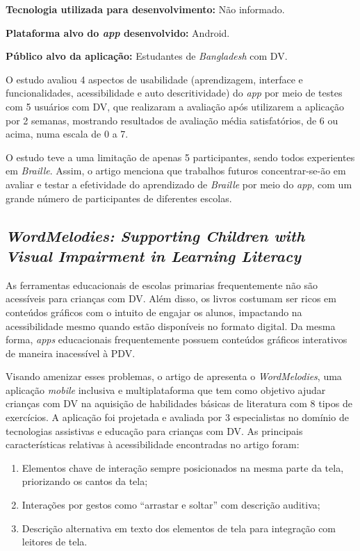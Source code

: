 \textbf{Tecnologia utilizada para desenvolvimento:} Não informado.

\textbf{Plataforma alvo do \emph{app} desenvolvido:} Android.

\textbf{Público alvo da aplicação:} Estudantes de \emph{Bangladesh} com DV\@.

O estudo avaliou 4 aspectos de usabilidade (aprendizagem, interface e funcionalidades, acessibilidade e auto descritividade) do \emph{app} por meio de testes com
5 usuários com DV, que realizaram a avaliação após utilizarem a aplicação por 2 semanas, mostrando resultados de avaliação média satisfatórios, de 6 ou acima, numa escala de 0 a 7.

O estudo teve a uma limitação de apenas 5 participantes, sendo todos experientes em \emph{Braille}.
Assim, o artigo menciona que trabalhos futuros concentrar-se-ão em avaliar e testar a efetividade do aprendizado de \emph{Braille} por meio
do \emph{app}, com um grande número de participantes de diferentes escolas.


\subsection{\emph{WordMelodies: Supporting Children with Visual Impairment in Learning Literacy}}

As ferramentas educacionais de escolas primarias frequentemente não são acessíveis para crianças com DV\@.
Além disso, os livros costumam ser ricos em conteúdos gráficos com o intuito de engajar os alunos, impactando na acessibilidade mesmo quando estão disponíveis no formato digital.
Da mesma forma, \emph{apps} educacionais frequentemente possuem conteúdos gráficos interativos de maneira inacessível à PDV\@.

Visando amenizar esses problemas, o artigo de  apresenta o \emph{WordMelodies}, uma aplicação \emph{mobile}
inclusiva e multiplataforma que tem como objetivo ajudar crianças com DV na aquisição de habilidades básicas de literatura com 8
tipos de exercícios. A aplicação foi projetada e avaliada por 3 especialistas no domínio de tecnologias assistivas e educação
para crianças com DV\@. As principais características relativas à acessibilidade encontradas no artigo foram:

\begin{enumerate}
    \item Elementos chave de interação sempre posicionados na mesma parte da tela, priorizando os cantos da tela;
    \item Interações por gestos como ``arrastar e soltar'' com descrição auditiva;
    \item Descrição alternativa em texto dos elementos de tela para integração com leitores de tela.
\end{enumerate}

